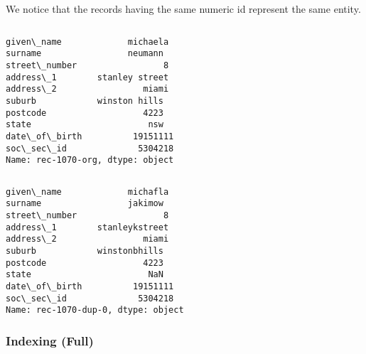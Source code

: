 \documentclass{article}
\begin{document}
    \begin{Verbatim}[commandchars=\\\{\}]

\end{Verbatim}
\begin{Verbatim}[commandchars=\\\{\}]

\end{Verbatim}
    \begin{Verbatim}[commandchars=\\\{\}]

\end{Verbatim}
\begin{Verbatim}[commandchars=\\\{\}]

\end{Verbatim}
    \begin{Verbatim}[commandchars=\\\{\}]

\end{Verbatim}
\begin{Verbatim}[commandchars=\\\{\}]

\end{Verbatim}
    We notice that the records having the same numeric id represent the same
entity.

    \begin{Verbatim}[commandchars=\\\{\}]

\end{Verbatim}
\begin{Verbatim}[commandchars=\\\{\}]
given\_name             michaela
surname                 neumann
street\_number                 8
address\_1        stanley street
address\_2                 miami
suburb            winston hills
postcode                   4223
state                       nsw
date\_of\_birth          19151111
soc\_sec\_id              5304218
Name: rec-1070-org, dtype: object
\end{Verbatim}
    \begin{Verbatim}[commandchars=\\\{\}]

\end{Verbatim}
\begin{Verbatim}[commandchars=\\\{\}]
given\_name             michafla
surname                 jakimow
street\_number                 8
address\_1        stanleykstreet
address\_2                 miami
suburb            winstonbhills
postcode                   4223
state                       NaN
date\_of\_birth          19151111
soc\_sec\_id              5304218
Name: rec-1070-dup-0, dtype: object
\end{Verbatim}
    \hypertarget{indexing-full}{%
\subsubsection{Indexing (Full)}\label{indexing-full}}
\end{document}
